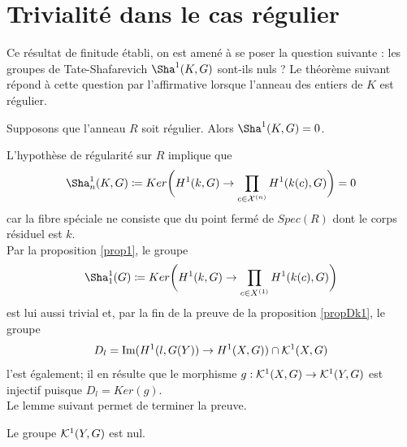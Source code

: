 \documentclass[11pt]{article}
\begin{document}
\section{Trivialité dans le cas régulier}
Ce résultat de finitude établi, on est amené à se poser la question suivante : les groupes de Tate-Shafarevich $\Sha^1(K,G)$ sont-ils nuls ? Le théorème suivant répond à cette question par l'affirmative lorsque l'anneau des entiers de $K$ est régulier.

\thme\label{thmezero} Supposons que l'anneau $R$ soit régulier. Alors $\Sha^1(K,G) = 0$.

\proof L'hypothèse de régularité sur $R$ implique que 
$$
\Sha_{n}^1(K,G) \coloneqq Ker \bigg( H^1(k, G) \ra \prod_{c \in \CX^{(n)}} H^1(k(c), G) \bigg) = 0
$$
car la fibre spéciale ne consiste que du point fermé de $Spec(R)$ dont le corps résiduel est $k$.\\
Par la proposition \ref{prop1}, le groupe 
$$
\Sha_{1}^1(G) \coloneqq Ker \bigg(H^1(k, G) \ra \prod_{c \in X^{(1)}} H^1(k(c), G) \bigg)
$$
est lui aussi trivial et, par la fin de la preuve de la proposition \ref{propDk1}, le groupe 
$$
D_l = \text{Im}(H^1(l, G(Y)) \rightarrow H^1(X, G) ) \cap \mathcal{K}^1(X, G)
$$
l'est également; il en résulte que le morphisme $g : \mathcal{K}^1(X, G) \rightarrow \mathcal{K}^1(Y, G)$ est injectif puisque $D_{l} = Ker(g)$.\\

Le lemme suivant permet de terminer la preuve.

\begin{lemme}
Le groupe $\mathcal{K}^1(Y, G)$ est nul.
\end{lemme}
\end{document}

